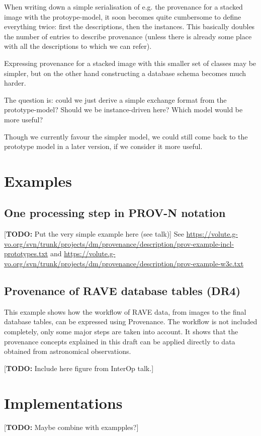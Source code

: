 \documentclass[11pt,a4paper]{ivoa}
\newcommand{\TODO}[1]{\noindent \textcolor{todocolor}{[\textbf{TODO:} #1]}}
\begin{document}
When writing down a simple serialisation of e.g. the provenance for a stacked image with the protoype-model, it soon becomes quite cumbersome to define everything twice: first the descriptions, then the instances. This basically doubles the number of entries to describe provenance (unless there is already some place with all the descriptions to which we can refer).

Expressing provenance for a stacked image with this smaller set of classes may be simpler, but on the other hand constructing a database schema becomes much harder. 

The question is: could we just derive a simple exchange format from the prototype-model? Should we be instance-driven here? Which model would be more useful?

Though we currently favour the simpler model, we could still come back to the prototype model in a later version, if we consider it more useful.



\section{Examples}\label{sec:examples}

\subsection{One processing step in PROV-N notation}
\TODO{Put the very simple example here (see talk)}
See \url{https://volute.g-vo.org/svn/trunk/projects/dm/provenance/description/prov-example-incl-prototypes.txt}
and \url{https://volute.g-vo.org/svn/trunk/projects/dm/provenance/description/prov-example-w3c.txt}


\subsection{Provenance of RAVE database tables (DR4)}
This example shows how the workflow of RAVE data, from images to the final database tables, can be expressed using Provenance. 
The workflow is not included completely, only some major steps are taken into account. It shows that the provenance concepts explained in this draft can be applied directly to data obtained from astronomical observations.

\TODO{Include here figure from InterOp talk.}



\section{Implementations}
\TODO{Maybe combine with exampples?}
\end{document}
